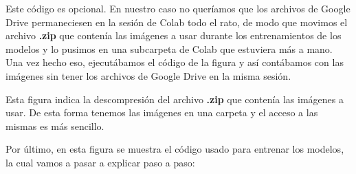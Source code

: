 
Este código es opcional. En nuestro caso no queríamos que los archivos de Google Drive permaneciesen en la sesión de Colab todo el rato, de modo que movimos el archivo \textbf{.zip} que contenía las imágenes a usar durante los entrenamientos de los modelos y lo pusimos en una subcarpeta de Colab que estuviera más a mano. Una vez hecho eso, ejecutábamos el código de la figura y así contábamos con las imágenes sin tener los archivos de Google Drive en la misma sesión.


Esta figura indica la descompresión del archivo \textbf{.zip} que contenía las imágenes a usar. De esta forma tenemos las imágenes en una carpeta y el acceso a las mismas es más sencillo.


Por último, en esta figura se muestra el código usado para entrenar los modelos, la cual vamos a pasar a explicar paso a paso:

